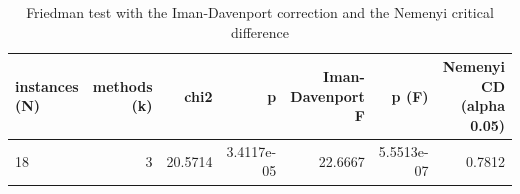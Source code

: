 \begin{table}[htbp]
\centering
\small
\caption{Friedman test with the Iman-Davenport correction and the Nemenyi critical difference}
\label{tab:E7_gurobi_threads_b60_friedman_test}
\begin{tabular}{lrrrrrr}
\toprule
instances (N) & methods (k) & chi2 & p & Iman-Davenport F & p (F) & Nemenyi CD (alpha 0.05) \\
\midrule
18 & 3 & 20.5714 & 3.4117e-05 & 22.6667 & 5.5513e-07 & 0.7812 \\
\bottomrule
\end{tabular}
\end{table}
